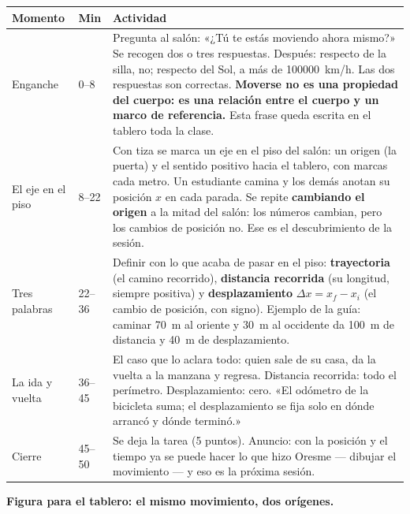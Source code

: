 \documentclass[11pt]{article}
\begin{document}
\begin{center}
{\renewcommand{\arraystretch}{1.3}
\begin{tabularx}{\linewidth}{@{}l l X@{}}
  \toprule
  \textbf{Momento} & \textbf{Min} & \textbf{Actividad}\\
  \midrule
  Enganche & 0--8 & Pregunta al salón: «¿Tú te estás moviendo ahora mismo?» Se recogen dos o
    tres respuestas. Después: respecto de la silla, no; respecto del Sol, a más de
    \qty{100000}{km/h}. Las dos respuestas son correctas. \textbf{Moverse no es una propiedad
    del cuerpo: es una relación entre el cuerpo y un marco de referencia.} Esta frase queda
    escrita en el tablero toda la clase.\\
  El eje en el piso & 8--22 & Con tiza se marca un eje en el piso del salón: un origen (la
    puerta) y el sentido positivo hacia el tablero, con marcas cada metro. Un estudiante
    camina y los demás anotan su posición $x$ en cada parada. Se repite \textbf{cambiando el
    origen} a la mitad del salón: los números cambian, pero los cambios de posición no. Ese
    es el descubrimiento de la sesión.\\
  Tres palabras & 22--36 & Definir con lo que acaba de pasar en el piso:
    \textbf{trayectoria} (el camino recorrido), \textbf{distancia recorrida} (su longitud,
    siempre positiva) y \textbf{desplazamiento} $\Delta x = x_f - x_i$ (el cambio de posición,
    con signo). Ejemplo de la guía: caminar \qty{70}{m} al oriente y \qty{30}{m} al occidente
    da \qty{100}{m} de distancia y \qty{+40}{m} de desplazamiento.\\
  La ida y vuelta & 36--45 & El caso que lo aclara todo: quien sale de su casa, da la vuelta a
    la manzana y regresa. Distancia recorrida: todo el perímetro. Desplazamiento: cero. «El
    odómetro de la bicicleta suma; el desplazamiento se fija solo en dónde arrancó y dónde
    terminó.»\\
  Cierre & 45--50 & Se deja la tarea (5 puntos). Anuncio: con la posición y el tiempo ya se
    puede hacer lo que hizo Oresme — dibujar el movimiento — y eso es la próxima sesión.\\
  \bottomrule
\end{tabularx}}
\end{center}

\textbf{Figura para el tablero: el mismo movimiento, dos orígenes.}
\end{document}
